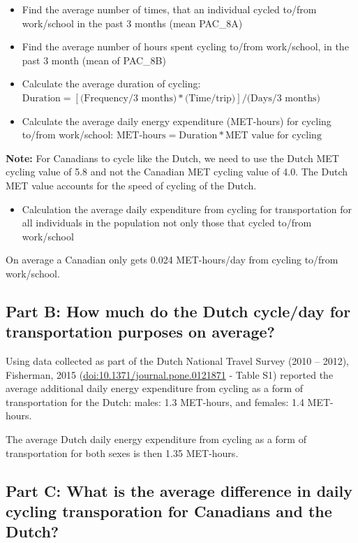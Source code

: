 \documentclass[]{book}
\providecommand{\tightlist}{%
  \setlength{\itemsep}{0pt}\setlength{\parskip}{0pt}}
\begin{document}
\begin{itemize}
\item
  Find the average number of times, that an individual cycled to/from
  work/school in the past 3 months (mean PAC\_8A)
\item
  Find the average number of hours spent cycling to/from work/school, in
  the past 3 month (mean of PAC\_8B)
\item
  Calculate the average duration of cycling:
  \(\text{Duration} = [\text{(Frequency/3 months)}*\text{(Time/trip)}] / \text{(Days/3 months)}\)
\item
  Calculate the average daily energy expenditure (MET-hours) for cycling
  to/from work/school:
  \(\text{MET-hours} = \text{Duration}*\text{MET value for cycling}\)
\end{itemize}

\textbf{Note:} For Canadians to cycle like the Dutch, we need to use the
Dutch MET cycling value of 5.8 and not the Canadian MET cycling value of
4.0. The Dutch MET value accounts for the speed of cycling of the Dutch.

\begin{itemize}
\tightlist
\item
  Calculation the average daily expenditure from cycling for
  transportation for all individuals in the population not only those
  that cycled to/from work/school
\end{itemize}

On average a Canadian only gets 0.024 MET-hours/day from cycling to/from
work/school.

\subsection{Part B: How much do the Dutch cycle/day for transportation
purposes on
average?}\label{part-b-how-much-do-the-dutch-cycleday-for-transportation-purposes-on-average}

Using data collected as part of the Dutch National Travel Survey (2010
-- 2012), Fisherman, 2015 (\url{doi:10.1371/journal.pone.0121871} -
Table S1) reported the average additional daily energy expenditure from
cycling as a form of transportation for the Dutch: males: 1.3 MET-hours,
and females: 1.4 MET-hours.

The average Dutch daily energy expenditure from cycling as a form of
transportation for both sexes is then 1.35 MET-hours.

\subsection{Part C: What is the average difference in daily cycling
transporation for Canadians and the
Dutch?}\label{part-c-what-is-the-average-difference-in-daily-cycling-transporation-for-canadians-and-the-dutch}
\end{document}
